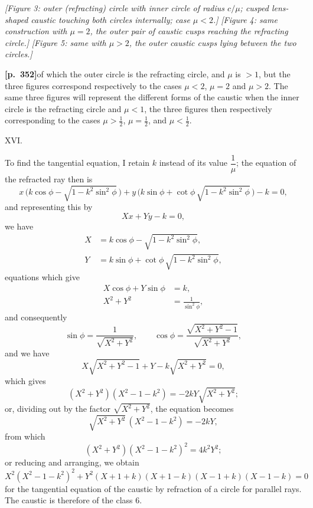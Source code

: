\documentclass[11pt]{article}
\begin{document}
\begin{center}
\textit{[Figure 3: outer (refracting) circle with inner circle of radius $c/\mu$; cusped lens-shaped caustic touching both circles internally; case $\mu < 2$.]}\quad
\textit{[Figure 4: same construction with $\mu = 2$, the outer pair of caustic cusps reaching the refracting circle.]}\quad
\textit{[Figure 5: same with $\mu > 2$, the outer caustic cusps lying between the two circles.]}
\end{center}

\noindent\textbf{[p.~352]}\quad of which the outer circle is the refracting circle, and $\mu$ is $> 1$, but the three figures correspond respectively to the cases $\mu < 2$, $\mu = 2$ and $\mu > 2$. The same three figures will represent the different forms of the caustic when the inner circle is the refracting circle and $\mu < 1$, the three figures then respectively corresponding to the cases $\mu > \tfrac{1}{2}$, $\mu = \tfrac{1}{2}$, and $\mu < \tfrac{1}{2}$.

\medskip
\begin{center}XVI.\end{center}

To find the tangential equation, I retain $k$ instead of its value $\dfrac{1}{\mu}$; the equation of the refracted ray then is
\[
x\,\bigl(k\cos\phi - \sqrt{1-k^{2}\sin^{2}\phi}\,\bigr) + y\,\bigl(k\sin\phi + \cot\phi\,\sqrt{1-k^{2}\sin^{2}\phi}\,\bigr) - k = 0,
\]
and representing this by
\[
Xx + Yy - k = 0,
\]
we have
\begin{align*}
X &= k\cos\phi - \sqrt{1-k^{2}\sin^{2}\phi},\\
Y &= k\sin\phi + \cot\phi\,\sqrt{1-k^{2}\sin^{2}\phi},
\end{align*}
equations which give
\begin{align*}
X\cos\phi + Y\sin\phi &= k,\\
X^{2} + Y^{2} &= \frac{1}{\sin^{2}\phi},
\end{align*}
and consequently
\[
\sin\phi = \frac{1}{\sqrt{X^{2}+Y^{2}}},\qquad \cos\phi = \frac{\sqrt{X^{2}+Y^{2}-1}}{\sqrt{X^{2}+Y^{2}}},
\]
and we have
\[
X\sqrt{X^{2}+Y^{2}-1} + Y - k\sqrt{X^{2}+Y^{2}} = 0,
\]
which gives
\[
(X^{2}+Y^{2})(X^{2}-1-k^{2}) = -2kY\sqrt{X^{2}+Y^{2}};
\]
or, dividing out by the factor $\sqrt{X^{2}+Y^{2}}$, the equation becomes
\[
\sqrt{X^{2}+Y^{2}}\,(X^{2}-1-k^{2}) = -2kY,
\]
from which
\[
(X^{2}+Y^{2})(X^{2}-1-k^{2})^{2} = 4k^{2}Y^{2};
\]
or reducing and arranging, we obtain
\[
X^{2}(X^{2}-1-k^{2})^{2} + Y^{2}(X+1+k)(X+1-k)(X-1+k)(X-1-k) = 0
\]
for the tangential equation of the caustic by refraction of a circle for parallel rays. The caustic is therefore of the class $6$.
\end{document}
